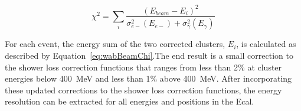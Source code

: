 \begin{equation}
	\label{eq:wabBeamChi}
	\chi^2 =\sum_{i} \dfrac{(E_{beam}-E_i)^2}{\sigma_{e-}^2(E_{e-})+\sigma_{\gamma}^2(E_{\gamma})}	
\end{equation}

For each event, the energy sum of the two corrected clusters, $E_i$, is calculated as described by Equation~\eqref{eq:wabBeamChi}.The end result is a small correction to the shower loss correction functions that ranges from less than 2$\%$ at cluster energies below 400~MeV and less than 1$\%$ above 400~MeV. After incorporating these updated corrections to the shower loss correction functions, the energy resolution can be extracted for all energies and positions in the Ecal.  
